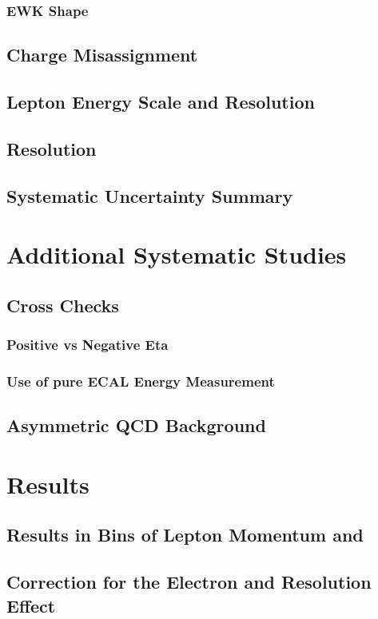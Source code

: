 \subsubsection{EWK \ETm Shape}
\subsection{Charge Misassignment}
\subsection{Lepton Energy Scale and Resolution}
\subsection{\ETm Resolution}
\subsection{Systematic Uncertainty Summary}

\section{Additional Systematic Studies}
\subsection{Cross Checks}
\subsubsection{Positive vs Negative Eta}
\subsubsection{Use of pure ECAL Energy Measurement}
\subsection{Asymmetric QCD Background}

\section{Results}
\subsection{Results in Bins of Lepton Momentum and \ETm}
\subsection{Correction for the Electron and \ETm Resolution Effect}


